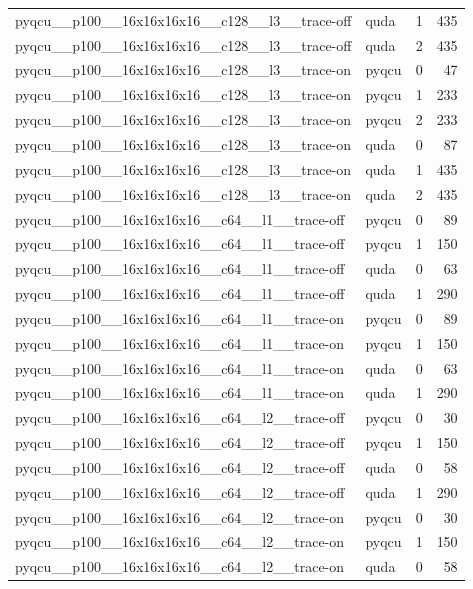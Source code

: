 \begin{table}[htbp]
\begin{tabular}{@{}llrr@{}}
pyqcu\_\_p100\_\_16x16x16x16\_\_c128\_\_l3\_\_trace-off & quda & 1 & 435 \\
pyqcu\_\_p100\_\_16x16x16x16\_\_c128\_\_l3\_\_trace-off & quda & 2 & 435 \\
pyqcu\_\_p100\_\_16x16x16x16\_\_c128\_\_l3\_\_trace-on & pyqcu & 0 & 47 \\
pyqcu\_\_p100\_\_16x16x16x16\_\_c128\_\_l3\_\_trace-on & pyqcu & 1 & 233 \\
pyqcu\_\_p100\_\_16x16x16x16\_\_c128\_\_l3\_\_trace-on & pyqcu & 2 & 233 \\
pyqcu\_\_p100\_\_16x16x16x16\_\_c128\_\_l3\_\_trace-on & quda & 0 & 87 \\
pyqcu\_\_p100\_\_16x16x16x16\_\_c128\_\_l3\_\_trace-on & quda & 1 & 435 \\
pyqcu\_\_p100\_\_16x16x16x16\_\_c128\_\_l3\_\_trace-on & quda & 2 & 435 \\
pyqcu\_\_p100\_\_16x16x16x16\_\_c64\_\_l1\_\_trace-off & pyqcu & 0 & 89 \\
pyqcu\_\_p100\_\_16x16x16x16\_\_c64\_\_l1\_\_trace-off & pyqcu & 1 & 150 \\
pyqcu\_\_p100\_\_16x16x16x16\_\_c64\_\_l1\_\_trace-off & quda & 0 & 63 \\
pyqcu\_\_p100\_\_16x16x16x16\_\_c64\_\_l1\_\_trace-off & quda & 1 & 290 \\
pyqcu\_\_p100\_\_16x16x16x16\_\_c64\_\_l1\_\_trace-on & pyqcu & 0 & 89 \\
pyqcu\_\_p100\_\_16x16x16x16\_\_c64\_\_l1\_\_trace-on & pyqcu & 1 & 150 \\
pyqcu\_\_p100\_\_16x16x16x16\_\_c64\_\_l1\_\_trace-on & quda & 0 & 63 \\
pyqcu\_\_p100\_\_16x16x16x16\_\_c64\_\_l1\_\_trace-on & quda & 1 & 290 \\
pyqcu\_\_p100\_\_16x16x16x16\_\_c64\_\_l2\_\_trace-off & pyqcu & 0 & 30 \\
pyqcu\_\_p100\_\_16x16x16x16\_\_c64\_\_l2\_\_trace-off & pyqcu & 1 & 150 \\
pyqcu\_\_p100\_\_16x16x16x16\_\_c64\_\_l2\_\_trace-off & quda & 0 & 58 \\
pyqcu\_\_p100\_\_16x16x16x16\_\_c64\_\_l2\_\_trace-off & quda & 1 & 290 \\
pyqcu\_\_p100\_\_16x16x16x16\_\_c64\_\_l2\_\_trace-on & pyqcu & 0 & 30 \\
pyqcu\_\_p100\_\_16x16x16x16\_\_c64\_\_l2\_\_trace-on & pyqcu & 1 & 150 \\
pyqcu\_\_p100\_\_16x16x16x16\_\_c64\_\_l2\_\_trace-on & quda & 0 & 58 \\

\end{tabular}
\end{table}
